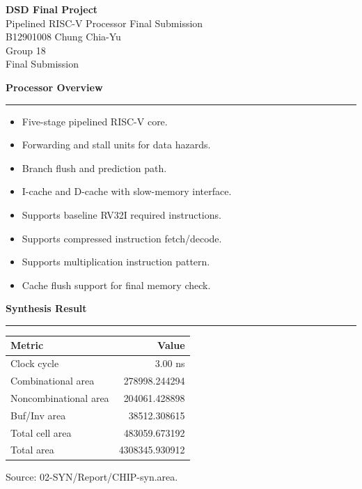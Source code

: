 \documentclass[12pt]{article}
\newcommand{\slidetitle}[1]{%
  {\LARGE\bfseries #1}\par
  \vspace{0.2em}\hrule\vspace{0.7em}
}
\newcommand{\twocol}[2]{%
  \begin{minipage}[t]{0.47\textwidth}#1\end{minipage}\hfill
  \begin{minipage}[t]{0.50\textwidth}#2\end{minipage}
}
\newcommand{\newslide}{\clearpage}
\begin{document}
\begin{center}
  \vspace*{1.2in}
  {\Huge\bfseries DSD Final Project}\\[0.4in]
  {\LARGE Pipelined RISC-V Processor Final Submission}\\[0.6in]
  {\Large B12901008 Chung Chia-Yu}\\[0.15in]
  {\Large Group 18}\\[1.0in]
  {\large Final Submission}
\end{center}

\newslide
\slidetitle{Processor Overview}
\twocol{
\begin{itemize}
  \item Five-stage pipelined RISC-V core.
  \item Forwarding and stall units for data hazards.
  \item Branch flush and prediction path.
  \item I-cache and D-cache with slow-memory interface.
\end{itemize}
}{
\begin{itemize}
  \item Supports baseline RV32I required instructions.
  \item Supports compressed instruction fetch/decode.
  \item Supports multiplication instruction pattern.
  \item Cache flush support for final memory check.
\end{itemize}
}

\newslide
\slidetitle{Synthesis Result}
\begin{center}
\begin{tabular}{|l|r|}
\hline
Metric & Value \\
\hline
Clock cycle & 3.00 ns \\
Combinational area & 278998.244294 \\
Noncombinational area & 204061.428898 \\
Buf/Inv area & 38512.308615 \\
Total cell area & 483059.673192 \\
Total area & 4308345.930912 \\
\hline
\end{tabular}
\end{center}

Source: 02-SYN/Report/CHIP-syn.area.
\end{document}
